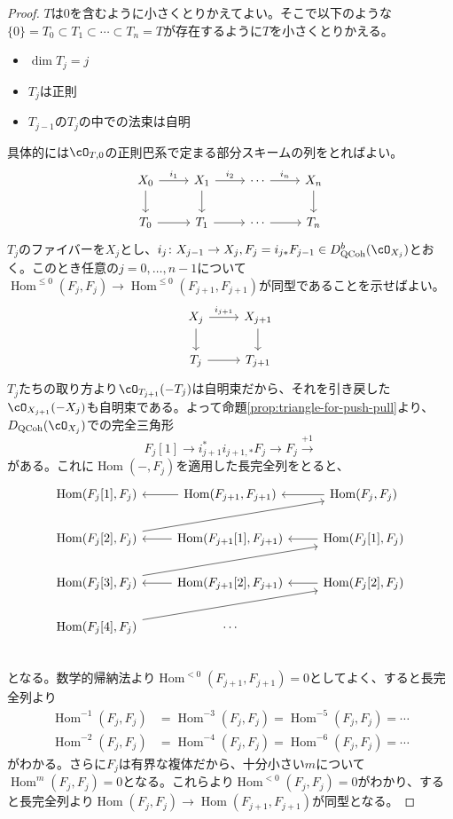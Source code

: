 \documentclass[uplatex, a4paper, dvipdfmx]{jsarticle}
\theoremstyle{definition}
\DeclareMathOperator{\Hom}{\mathrm{Hom}}
\DeclareMathOperator{\QCoh}{\mathrm{QCoh}}
\begin{document}
\begin{proof}
    $T$は$0$を含むように小さくとりかえてよい。そこで以下のような$\{0\} = T_0 \subset T_1 \subset \cdots \subset T_n = T$が存在するように$T$を小さくとりかえる。
    \begin{itemize}
        \item $\dim T_j = j$
        \item $T_j$は正則
        \item $T_{j-1}$の$T_j$の中での法束は自明
    \end{itemize}
    具体的には$\cO_{T, 0}$の正則巴系で定まる部分スキームの列をとればよい。
    \[
        \begin{tikzcd}
            X_0 \ar[r, "i_1"] \ar[d] & X_1 \ar[r, "i_2"] \ar[d] & \cdots \ar[r, "i_n"]& X_n \ar[d] \\
            T_0 \ar[r] & T_1 \ar[r] & \cdots \ar[r]& T_n
        \end{tikzcd}
    \]
    $T_j$のファイバーを$X_j$とし、$i_j \colon X_{j-1} \to X_{j}, F_{j} = i_{j*}F_{j-1} \in D_{\QCoh}^b(\cO_{X_j})$とおく。このとき任意の$j = 0, \dots, n-1$について$\Hom^{\leq 0}(F_{j}, F_{j}) \to \Hom^{\leq 0}(F_{j+1}, F_{j+1})$が同型であることを示せばよい。
    \[
        \begin{tikzcd}
            X_{j} \ar[r, "i_{j+1}"] \ar[d] & X_{j+1} \ar[d]\\
            T_{j} \ar[r] & T_{j+1}
        \end{tikzcd}
    \]
    $T_j$たちの取り方より$\cO_{T_{j+1}}(-T_{j})$は自明束だから、それを引き戻した$\cO_{X_{j+1}}(-X_{j})$も自明束である。よって命題\ref{prop:triangle-for-push-pull}より、$D_{\QCoh}(\cO_{X_j})$での完全三角形
    \begin{equation}
        F_j[1] \to i_{j+1}^*i_{j+1, *}F_j \to F_j \xrightarrow{+1}
    \end{equation}
    がある。これに$\Hom(-, F_j)$を適用した長完全列をとると、
    \[
        \begin{tikzcd}
            \Hom(F_j[1], F_j) & \Hom(F_{j+1}, F_{j+1}) \ar[l] & \Hom(F_j, F_j) \ar[l] \\
            \Hom(F_j[2], F_j) \ar[rru] & \Hom(F_{j+1}[1], F_{j+1}) \ar[l] & \Hom(F_j[1], F_j) \ar[l] \\
            \Hom(F_j[3], F_j) \ar[rru] & \Hom(F_{j+1}[2], F_{j+1}) \ar[l] & \Hom(F_j[2], F_j) \ar[l] \\
            \Hom(F_j[4], F_j) \ar[rru]& \cdots &\\
        \end{tikzcd}
    \]
    となる。数学的帰納法より$\Hom^{<0}(F_{j+1}, F_{j+1}) = 0$としてよく、すると長完全列より
    \begin{align}
        \Hom^{-1}(F_j, F_j) & = \Hom^{-3}(F_j, F_j) = \Hom^{-5}(F_j, F_j) = \cdots \\
        \Hom^{-2}(F_j, F_j) & = \Hom^{-4}(F_j, F_j) =\Hom^{-6}(F_j, F_j) = \cdots
    \end{align}
    がわかる。さらに$F_j$は有界な複体だから、十分小さい$m$について$\Hom^m(F_j, F_j) = 0$となる。これらより$\Hom^{<0}(F_j, F_j) = 0$がわかり、すると長完全列より$\Hom(F_j, F_j) \to \Hom(F_{j+1}, F_{j+1})$が同型となる。
\end{proof}
\end{document}
